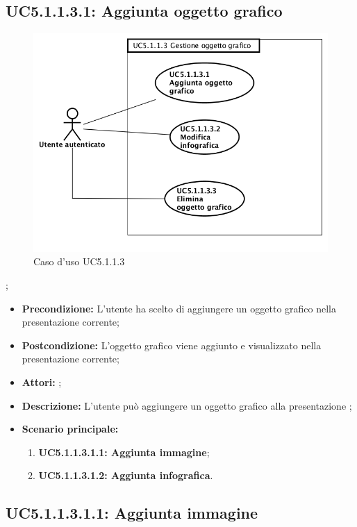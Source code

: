 \subsection{ UC5.1.1.3.1: Aggiunta oggetto grafico}

\begin{figure}[h]
	\begin{center}
	\includegraphics[scale=0.4]{diagram/UC5-1-1-3.png}
	\caption{Caso d'uso UC5.1.1.3}
	\end{center}
\end{figure};
\begin{itemize}
	\item \textbf{Precondizione:} L'utente ha scelto di aggiungere un oggetto grafico nella presentazione corrente;
	\item \textbf{Postcondizione:} L'oggetto grafico viene aggiunto e visualizzato nella presentazione corrente;
	\item \textbf{Attori:} ;
	\item \textbf{Descrizione:} L'utente può aggiungere un oggetto grafico alla presentazione ;
	\item \textbf{Scenario principale:}
	\begin{enumerate}
		\item \textbf{ UC5.1.1.3.1.1: Aggiunta immagine};
		\item \textbf{ UC5.1.1.3.1.2: Aggiunta infografica}.
	\end{enumerate}
\end{itemize}
\subsection{ UC5.1.1.3.1.1: Aggiunta immagine}

